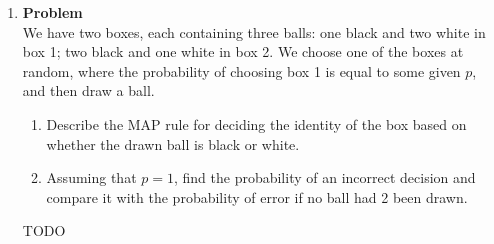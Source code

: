 \documentclass[12pt]{article}
\newenvironment{Ex}{\textbf{Problem}\vspace{.75em}\\}{}
\begin{document}
\begin{enumerate}
\item
  \begin{Ex}
    We have two boxes, each containing three balls: one black and two
    white in box 1; two black and one white in box 2. We choose one of
    the boxes at random, where the probability of choosing box 1 is
    equal to some given $p$, and then draw a ball.
    \begin{enumerate}
    \item Describe the MAP rule for deciding the identity of the box
      based on whether the drawn ball is black or white.
    \item Assuming that $p = 1$, find the probability of an incorrect
      decision and compare it with the probability of error if no ball
      had 2 been drawn.
    \end{enumerate}
    \begin{solution} \hfill
      {\color{red} \huge TODO}
    \end{solution}
  \end{Ex}

\end{enumerate}
\end{document}
